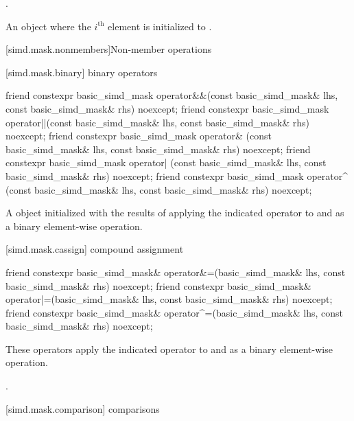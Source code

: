 \begin{itemdescr}
  \pnum\constraints
  .

  \pnum\returns
  An object where the $i^\text{th}$ element is initialized to .
\end{itemdescr}

[simd.mask.nonmembers]{Non-member operations}

[simd.mask.binary]{ binary operators}

\begin{itemdecl}
friend constexpr basic_simd_mask operator&&(const basic_simd_mask& lhs, const basic_simd_mask& rhs) noexcept;
friend constexpr basic_simd_mask operator||(const basic_simd_mask& lhs, const basic_simd_mask& rhs) noexcept;
friend constexpr basic_simd_mask operator& (const basic_simd_mask& lhs, const basic_simd_mask& rhs) noexcept;
friend constexpr basic_simd_mask operator| (const basic_simd_mask& lhs, const basic_simd_mask& rhs) noexcept;
friend constexpr basic_simd_mask operator^ (const basic_simd_mask& lhs, const basic_simd_mask& rhs) noexcept;
\end{itemdecl}

\begin{itemdescr}
  \pnum\returns
  A  object initialized with the results of applying the indicated operator to  and  as a binary element-wise operation.
\end{itemdescr}

[simd.mask.cassign]{ compound assignment}

\begin{itemdecl}
friend constexpr basic_simd_mask& operator&=(basic_simd_mask& lhs, const basic_simd_mask& rhs) noexcept;
friend constexpr basic_simd_mask& operator|=(basic_simd_mask& lhs, const basic_simd_mask& rhs) noexcept;
friend constexpr basic_simd_mask& operator^=(basic_simd_mask& lhs, const basic_simd_mask& rhs) noexcept;
\end{itemdecl}

\begin{itemdescr}
  \pnum\effects
  These operators apply the indicated operator to  and  as a binary element-wise operation.

  \pnum\returns
  .
\end{itemdescr}

[simd.mask.comparison]{ comparisons}


